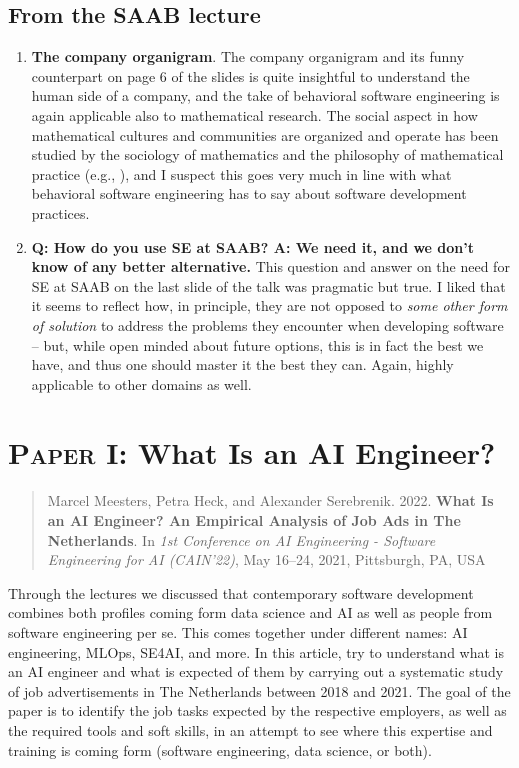 \subsection*{From the SAAB lecture}

\begin{enumerate}
    \item \textbf{The company organigram}.
    The company organigram and its  funny counterpart on page 6 of the slides is quite insightful to understand the human side of a company, and the take of behavioral software engineering is again applicable also to mathematical research. The social aspect in how mathematical cultures and communities are organized and operate has been studied by the sociology of mathematics and the philosophy of mathematical practice (e.g., \cite{mancosu2008philosophy, wagner2017making, sriraman2024handbook}), and I suspect this goes very much in line with what behavioral software engineering has to say about software development practices.
    \item \textbf{Q: How do you use SE at SAAB? A: We need it, and we don't know of any better alternative.}
    This question and answer on the need for SE at SAAB on the last slide of the talk was pragmatic but true. I liked that it seems to reflect how, in principle, they are not opposed to \emph{some other form of solution} to address the problems they encounter when developing software -- but, while open minded about future options, this is in fact the best we have, and thus one should master it the best they can. Again, highly applicable to other domains as well.
\end{enumerate}
\section{\textsc{Paper I}: What Is an AI Engineer? \cite{meesters2022ai}}

\begin{quote}
    Marcel Meesters, Petra Heck, and Alexander Serebrenik. 2022. \textbf{What Is an AI Engineer? An Empirical Analysis of Job Ads in The Netherlands}. In \textit{1st Conference on AI Engineering - Software Engineering for AI (CAIN’22)}, May 16–24, 2021, Pittsburgh, PA, USA
\end{quote}

Through the lectures we discussed that contemporary software development combines both profiles coming form data science and AI as well as people from software engineering per se. This comes together under different names: AI engineering, MLOps, SE4AI, and more. In this article, \citeauthor{meesters2022ai} try to understand what is an AI engineer and what is expected of them by carrying out a systematic study of job advertisements in The Netherlands between 2018 and 2021. The goal of the paper is to identify the job tasks expected by the respective employers, as well as the required tools and soft skills, in an attempt to see where this expertise and training is coming form (software engineering, data science, or both).

